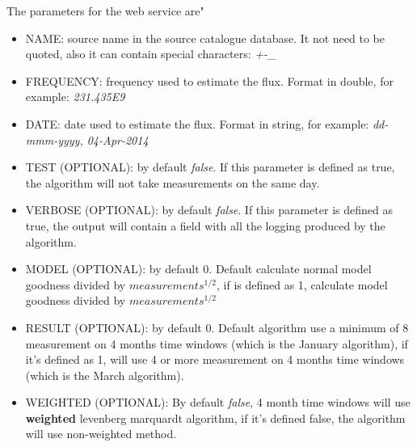 \documentclass[10pt]{article}
\begin{document}
\noindent The parameters for the web service are"
\begin{itemize}
 \item NAME: source name in the source catalogue database. It not need to be quoted, also it can contain special characters: \emph{+-\_}
 \item FREQUENCY: frequency used to estimate the flux. Format in double, for example: \emph{231.435E9}
 \item DATE: date used to estimate the flux. Format in string, for example: \emph{dd-mmm-yyyy, 04-Apr-2014}
 \item TEST (OPTIONAL): by default \emph{false}. If this parameter is defined as true, the algorithm will not take measurements on the same day.
 \item VERBOSE (OPTIONAL): by default \emph{false}. If this parameter is defined as true, the output will contain a field with all the logging produced by the algorithm.
 \item MODEL (OPTIONAL): by default 0. Default calculate normal model goodness divided by $measurements^{1/2}$, if is defined as 1, calculate model goodness divided by $measurements^{1/2}$
 \item RESULT (OPTIONAL): by default 0. Default algorithm use a minimum of 8 measurement on 4 months time windows (which is the January algorithm), if it's defined as 1, will use 4 or more measurement on 4 months time windows (which is the March algorithm).
 \item WEIGHTED (OPTIONAL): By default \emph{false}, 4 month time windows will use \textbf{weighted} levenberg marquardt algorithm, if it's defined false, the algorithm will use non-weighted method.
\end{itemize}
\end{document}
